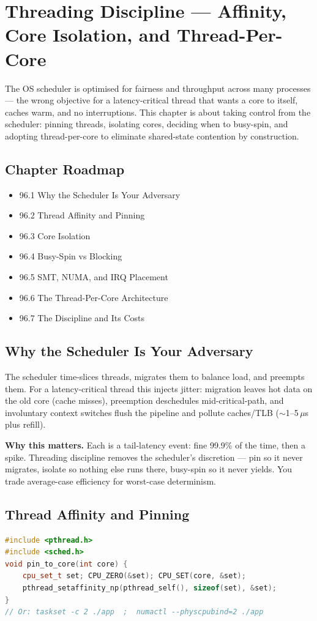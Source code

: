\chapter{Threading Discipline --- Affinity, Core Isolation, and Thread-Per-Core}

The OS scheduler is optimised for fairness and throughput across many processes --- the wrong objective for a latency-critical thread that wants a core to itself, caches warm, and no interruptions. This chapter is about taking control from the scheduler: pinning threads, isolating cores, deciding when to busy-spin, and adopting thread-per-core to eliminate shared-state contention by construction.

\section*{Chapter Roadmap}
\begin{itemize}
\item 96.1 Why the Scheduler Is Your Adversary
\item 96.2 Thread Affinity and Pinning
\item 96.3 Core Isolation
\item 96.4 Busy-Spin vs Blocking
\item 96.5 SMT, NUMA, and IRQ Placement
\item 96.6 The Thread-Per-Core Architecture
\item 96.7 The Discipline and Its Costs
\end{itemize}

\section{Why the Scheduler Is Your Adversary}
The scheduler time-slices threads, migrates them to balance load, and preempts them. For a latency-critical thread this injects jitter: migration leaves hot data on the old core (cache misses), preemption deschedules mid-critical-path, and involuntary context switches flush the pipeline and pollute caches/TLB ($\sim$1--5\,$\mu$s plus refill).

\textbf{Why this matters.} Each is a tail-latency event: fine 99.9\% of the time, then a spike. Threading discipline removes the scheduler's discretion --- pin so it never migrates, isolate so nothing else runs there, busy-spin so it never yields. You trade average-case efficiency for worst-case determinism.

\section{Thread Affinity and Pinning}
\begin{lstlisting}[language=C++, caption={Pinning a thread to a core; Linux-specific. Min standard: C++11 + POSIX.}]
#include <pthread.h>
#include <sched.h>
void pin_to_core(int core) {
    cpu_set_t set; CPU_ZERO(&set); CPU_SET(core, &set);
    pthread_setaffinity_np(pthread_self(), sizeof(set), &set);
}
// Or: taskset -c 2 ./app  ;  numactl --physcpubind=2 ./app
\end{lstlisting}

